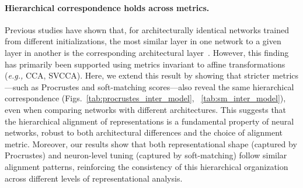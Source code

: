 \paragraph{Hierarchical correspondence holds across metrics.}
\label{par: inter-network}


Previous studies have shown that, for architecturally identical networks trained from different initializations, the most similar layer in one network to a given layer in another is the corresponding architectural layer~\citep{kornblith2019similarity}. However, this finding has primarily been supported using metrics invariant to affine transformations (\emph{e.g.,} CCA, SVCCA). Here, we extend this result by showing that stricter metrics---such as Procrustes and soft-matching scores---also reveal the same hierarchical correspondence (Figs.~\ref{tab:procrustes_inter_model}, ~\ref{tab:sm_inter_model}), even when comparing networks with different architectures. This suggests that the hierarchical alignment of representations is a fundamental property of neural networks, robust to both architectural differences and the choice of alignment metric. Moreover, our results show that both representational shape (captured by Procrustes) and neuron-level tuning (captured by soft-matching) follow similar alignment patterns, reinforcing the consistency of this hierarchical organization across different levels of representational analysis.